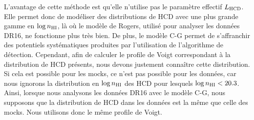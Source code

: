 \documentclass[11pt, twoside, a4paper, openright]{report}
\begin{document}
L'avantage de cette méthode est qu'elle n'utilise pas le paramètre effectif $L_{\textsc{HCD}}$. Elle permet donc de modéliser des distributions de HCD avec une plus grande gamme en $\log n_{\textsc{HI}}$, là où le modèle de Rogers, utilisé pour analyser les données DR16, ne fonctionne plus très bien.
De plus, le modèle C-G permet de s'affranchir des potentiels systématiques produites par l'utilisation de l'algorithme de détection.
Cependant, afin de calculer le profile de Voigt correspondant à la distribution de HCD présents, nous devons justement connaître cette distribution. Si cela est possible pour les mocks, ce n'est pas possible pour les données, car nous ignorons la distribution en $\log n_{\textsc{HI}}$ des HCD pour lesquels $\log n_{\textsc{HI}} < \num{20.3}$.
Ainsi, lorsque nous analysons les données DR16 avec le modèle C-G, nous supposons que la distribution de HCD dans les données est la même que celle des mocks. Nous utilisons donc le même profile de Voigt.
\end{document}
